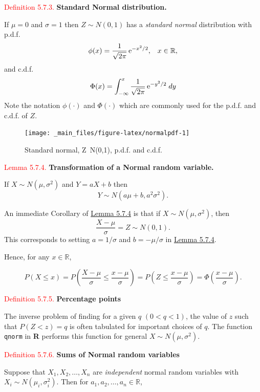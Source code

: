 \documentclass[
]{book}
\begin{document}
\leavevmode{}%
\textcolor{red}{Definition 5.7.3.}
{\textbf{Standard Normal distribution.}}

If \(\mu = 0\) and \(\sigma = 1\) then \(Z \sim N(0,1)\) has a \emph{standard normal} distribution with p.d.f.
\[
\phi(x) = \frac{1}{\sqrt{2 \pi}} \, {\rm e}^{-x^{2}/2 }, \; \; \; x \in \mathbb{R},
\]
and c.d.f.
\[
\Phi (x)  = \int_{- \infty}^{x} \frac{1}{\sqrt{2 \pi}} \, {\rm e}^{-y^{2}/2 } \; dy
\]
Note the notation \(\phi (\cdot)\) and \(\Phi (\cdot)\) which are commonly used for the p.d.f. and c.d.f. of \(Z\).

\begin{figure}
\texttt{[image: \_main\_files/figure-latex/normalpdf-1]} \caption{Standard normal, Z~N(0,1), p.d.f. and c.d.f.}\label{fig:normalpdf}
\end{figure}

\leavevmode{}%
\textcolor{red}{Lemma 5.7.4.}
{\textbf{Transformation of a Normal random variable.}}

If \(X \sim N(\mu, \sigma^2)\) and \(Y=aX+b\) then
\[ Y \sim N (a \mu +b, a^2 \sigma^2).\]

An immediate Corollary of \protect\hyperlink{rv:lem:tranform_normal}{Lemma 5.7.4} is that if \(X \sim N(\mu, \sigma^2)\), then
\[ \frac{X - \mu}{\sigma} = Z \sim N(0,1).\]
This corresponds to setting \(a=1/\sigma\) and \(b=-\mu/\sigma\) in \protect\hyperlink{rv:lem:tranform_normal}{Lemma 5.7.4}.

Hence, for any \(x \in \mathbb{R}\),

\[ P (X \leq x) = P \left( \frac{X-\mu}{\sigma} \leq \frac{x-\mu}{\sigma} \right) = P \left( Z \leq \frac{x-\mu}{\sigma} \right) = \Phi \left( \frac{x-\mu}{\sigma} \right).\]

\leavevmode{}%
\textcolor{red}{Definition 5.7.5.}
{\textbf{Percentage points}}

The inverse problem of finding for a given \(q\) \((0<q<1)\), the value of \(z\) such that \(P(Z < z)=q\) is often tabulated for important choices of \(q\). The function \texttt{qnorm} in \textbf{R} performs this function for general \(X \sim N(\mu,\sigma^2)\).

\leavevmode{}%
\textcolor{red}{Definition 5.7.6.}
{\textbf{Sums of Normal random variables}}

Suppose that \(X_1, X_2, \ldots, X_n\) are \emph{independent} normal random variables with \(X_i \sim N(\mu_i, \sigma_i^2)\). Then for \(a_1, a_2, \ldots, a_n \in \mathbb{R}\),
\end{document}
